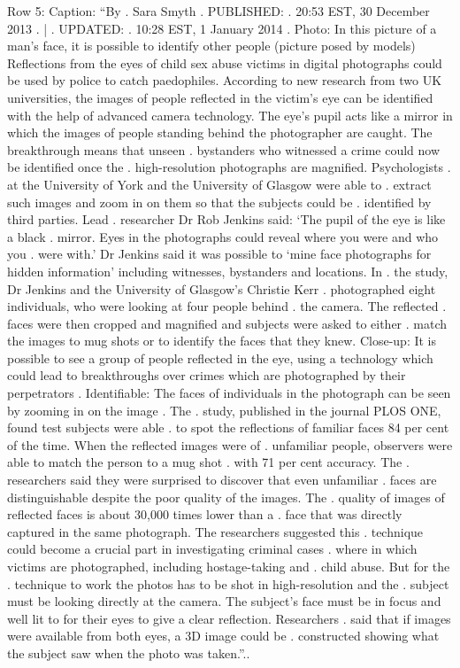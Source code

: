 \begin{table}[H]
\centering
\caption{Row 5\ifshowcaption{}: Caption: ``By . Sara Smyth . PUBLISHED: . 20:53 EST, 30 December 2013 . | . UPDATED: . 10:28 EST, 1 January 2014 . Photo: In this picture of a man's face, it is possible to identify other people (picture posed by models) Reflections from the eyes of child sex abuse victims in digital photographs could be used by police to catch paedophiles. According to new research from two UK universities, the images of people reflected in the victim's eye can be identified with the help of advanced camera technology. The eye's pupil acts like a mirror in which the images of people standing behind the photographer are caught. The breakthrough means that unseen . bystanders who witnessed a crime could now be identified once the . high-resolution photographs are magnified. Psychologists . at the University of York and the University of Glasgow were able to . extract such images and zoom in on them so that the subjects could be . identified by third parties. Lead . researcher Dr Rob Jenkins said: ‘The pupil of the eye is like a black . mirror. Eyes in the photographs could reveal where you were and who you . were with.' Dr Jenkins said it was possible to ‘mine face photographs for hidden information' including witnesses, bystanders and locations. In . the study, Dr Jenkins and the University of Glasgow's Christie Kerr . photographed eight individuals, who were looking at four people behind . the camera. The reflected . faces were then cropped and magnified and subjects were asked to either . match the images to mug shots or to identify the faces that they knew. Close-up: It is possible to see a group of people reflected in the eye, using a technology which could lead to breakthroughs over crimes which are photographed by their perpetrators . Identifiable: The faces of individuals in the photograph can be seen by zooming in on the image . The . study, published in the journal PLOS ONE, found test subjects were able . to spot the reflections of familiar faces 84 per cent of the time. When the reflected images were of . unfamiliar people, observers were able to match the person to a mug shot . with 71 per cent accuracy. The . researchers said they were surprised to discover that even unfamiliar . faces are distinguishable despite the poor quality of the images. The . quality of images of reflected faces is about 30,000 times lower than a . face that was directly captured in the same photograph. The researchers suggested this . technique could become a crucial part in investigating criminal cases . where in which victims are photographed, including hostage-taking and . child abuse. But for the . technique to work the photos has to be shot in high-resolution and the . subject must be looking directly at the camera. The subject's face must be in focus and well lit to for their eyes to give a clear reflection. Researchers . said that if images were available from both eyes, a 3D image could be . constructed showing what the subject saw when the photo was taken.''.\else.\fi}

\end{table}
